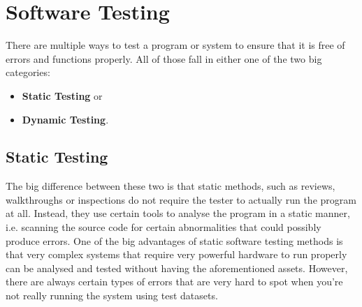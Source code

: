 \documentclass[11pt,a4paper,oneside,svgnames]{report}
\begin{document}
\chapter{Software Testing}
There are multiple ways to test a program or system to ensure that it is free of errors and functions properly. All of those fall in either one of the two big categories:
\begin{itemize}
\item \textbf{Static Testing} or
\item \textbf{Dynamic Testing}.
\end{itemize}

\section{Static Testing}
The big difference between these two is that static methods, such as reviews, walkthroughs or inspections do not require the tester to actually run the program at all. Instead, they use certain tools to analyse the program in a static manner, i.e. scanning the source code for certain abnormalities that could possibly produce errors. One of the big advantages of static software testing methods is that very complex systems that require very powerful hardware to run properly can be analysed and tested without having the aforementioned assets. However, there are always certain types of errors that are very hard to spot when you're not really running the system using test datasets.   
\end{document}
